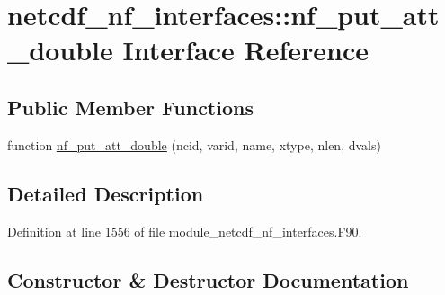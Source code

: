 \hypertarget{interfacenetcdf__nf__interfaces_1_1nf__put__att__double}{}\section{netcdf\+\_\+nf\+\_\+interfaces\+:\+:nf\+\_\+put\+\_\+att\+\_\+double Interface Reference}
\label{interfacenetcdf__nf__interfaces_1_1nf__put__att__double}
\subsection*{Public Member Functions}
\begin{DoxyCompactItemize}
\item 
function \hyperlink{interfacenetcdf__nf__interfaces_1_1nf__put__att__double_ac831797c004b6a7ccba1087640a4b39e}{nf\+\_\+put\+\_\+att\+\_\+double} (ncid, varid, name, xtype, nlen, dvals)
\end{DoxyCompactItemize}


\subsection{Detailed Description}


Definition at line 1556 of file module\+\_\+netcdf\+\_\+nf\+\_\+interfaces.\+F90.



\subsection{Constructor \& Destructor Documentation}
\mbox{\label{interfacenetcdf__nf__interfaces_1_1nf__put__att__double_ac831797c004b6a7ccba1087640a4b39e}} 
